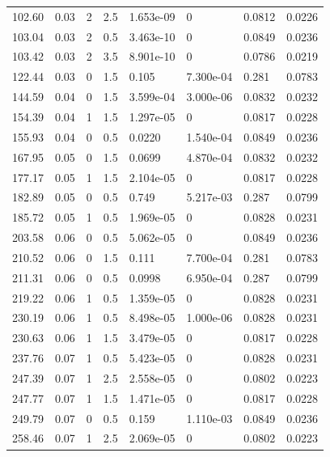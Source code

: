 \documentclass[preview]{standalone}
\begin{document}
{{\begin{tabular}{L{1.2cm}C{1.2cm} C{0.3cm}C{0.5cm} C{1.4cm}C{1.4cm} C{1.4cm}C{1.4cm}}
  102.60  &  0.03  & 2     & 2.5 &  1.653e-09  & 0  & 0.0812 &  0.0226   \\ 
  103.04  &  0.03  & 2     & 0.5 &  3.463e-10  & 0  & 0.0849 &  0.0236   \\ 
  103.42  &  0.03  & 2     & 3.5 &  8.901e-10  & 0  & 0.0786 &  0.0219   \\ 
  122.44  &  0.03  & 0     & 1.5 &  0.105  & 7.300e-04  & 0.281 &  0.0783   \\ 
  144.59  &  0.04  & 0     & 1.5 &  3.599e-04  & 3.000e-06  & 0.0832 &  0.0232   \\ 
  154.39  &  0.04  & 1     & 1.5 &  1.297e-05  & 0  & 0.0817 &  0.0228   \\ 
  155.93  &  0.04  & 0     & 0.5 &  0.0220  & 1.540e-04  & 0.0849 &  0.0236   \\ 
  167.95  &  0.05  & 0     & 1.5 &  0.0699  & 4.870e-04  & 0.0832 &  0.0232   \\ 
  177.17  &  0.05  & 1     & 1.5 &  2.104e-05  & 0  & 0.0817 &  0.0228   \\ 
  182.89  &  0.05  & 0     & 0.5 &  0.749  & 5.217e-03  & 0.287 &  0.0799   \\ 
  185.72  &  0.05  & 1     & 0.5 &  1.969e-05  & 0  & 0.0828 &  0.0231   \\ 
  203.58  &  0.06  & 0     & 0.5 &  5.062e-05  & 0  & 0.0849 &  0.0236   \\ 
  210.52  &  0.06  & 0     & 1.5 &  0.111  & 7.700e-04  & 0.281 &  0.0783   \\ 
  211.31  &  0.06  & 0     & 0.5 &  0.0998  & 6.950e-04  & 0.287 &  0.0799   \\ 
  219.22  &  0.06  & 1     & 0.5 &  1.359e-05  & 0  & 0.0828 &  0.0231   \\ 
  230.19  &  0.06  & 1     & 0.5 &  8.498e-05  & 1.000e-06  & 0.0828 &  0.0231   \\ 
  230.63  &  0.06  & 1     & 1.5 &  3.479e-05  & 0  & 0.0817 &  0.0228   \\ 
  237.76  &  0.07  & 1     & 0.5 &  5.423e-05  & 0  & 0.0828 &  0.0231   \\ 
  247.39  &  0.07  & 1     & 2.5 &  2.558e-05  & 0  & 0.0802 &  0.0223   \\ 
  247.77  &  0.07  & 1     & 1.5 &  1.471e-05  & 0  & 0.0817 &  0.0228   \\ 
  249.79  &  0.07  & 0     & 0.5 &  0.159  & 1.110e-03  & 0.0849 &  0.0236   \\ 
  258.46  &  0.07  & 1     & 2.5 &  2.069e-05  & 0  & 0.0802 &  0.0223   \\ 

\end{tabular}}}
\end{document}

